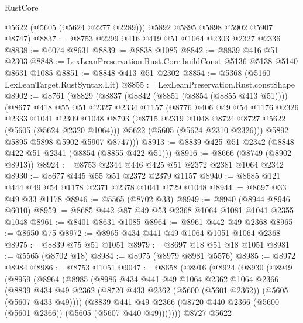 \begin{lexlean}{RustCore}
\begin{coremodule}
        @5622
        (@5605 (@5624 @2277 @2289)))
      @5892
      @5895
      @5898
      @5902
      @5907
      @8747)
@8837 := @8753 @2299 @416 @419 @51 @1064 @2303 @2327 @2336
@8838 := @6074 @8631
@8839 := @8838 @1085
@8842 := @8839 @416 @51 @2303
@8848 := LexLeanPreservation.Rust.Corr.buildConst @5136 @5138 @5140 @8631 @1085
@8851 := @8848 @413 @51 @2302
@8854 := @5368 (@5160 LexLeanTarget.RustSyntax.Lit)
@8855 := LexLeanPreservation.Rust.constShape
@8902 := @8761
    (@8829
      (@8837
        (@8842 (@8851 (@8854 (@8855 @413 @51))))
        (@8677
          @418
          @55
          @51
          @2327
          @2334
          @1157
          (@8776
            @406
            @49
            @54
            @1176
            @2326
            @2333
            @1041
            @2309
            @1048
            @8793
            (@8715 @2319 @1048 @8724 @8727 @5622 (@5605 (@5624 @2320 @1064)))
            @5622
            (@5605 (@5624 @2310 @2326)))
          @5892
          @5895
          @5898
          @5902
          @5907
          @8747)))
@8913 := @8839 @425 @51 @2342 (@8848 @422 @51 @2341 (@8854 (@8855 @422 @51)))
@8916 := @8666 (@8749 (@8902 @8913))
@8924 := @8753 @2344 @446 @425 @51 @2372 @2381 @1064 @2342
@8930 := @8677 @445 @55 @51 @2372 @2379 @1157
@8940 := @8685 @121 @444 @49 @54 @1178 @2371 @2378 @1041 @729 @1048
@8944 := @8697 @33 @49 @33 @1178
@8946 := @5565 (@8702 @33)
@8949 := @8940 (@8944 @8946 @6010)
@8959 := @8685 @442 @87 @49 @53 @2368 @1064 @1081 @1041 @2355 @1048
@8961 := @8401 @8631 @1085
@8964 := @8961 @442 @49 @2368
@8965 := @8650 @75
@8972 := @8965 @434 @441 @49 @1064 @1051 @1064 @2368
@8975 := @8839 @75 @51 @1051
@8979 := @8697 @18 @51 @18 @1051
@8981 := @5565 (@8702 @18)
@8984 := @8975 (@8979 @8981 @5576)
@8985 := @8972 @8984
@8986 := @8753 @1051
@9047 := @8658
    (@8916
      (@8924
        (@8930
          (@8949
            (@8959
              (@8964
                (@8985
                  (@8986
                    @434
                    @441
                    @49
                    @1064
                    @2362
                    @1064
                    @2366
                    (@8839
                      @434
                      @49
                      @2362
                      (@8720 @433 @2362 (@5600 (@5601 @2362)) (@5605 (@5607 @433 @49))))
                    (@8839
                      @441
                      @49
                      @2366
                      (@8720 @440 @2366 (@5600 (@5601 @2366)) (@5605 (@5607 @440 @49)))))))
              @8727
              @5622

\end{coremodule}
\end{lexlean}
